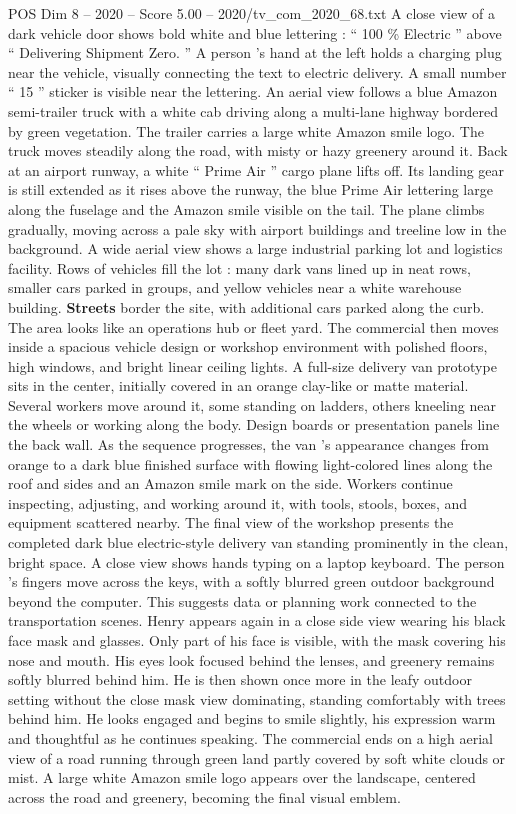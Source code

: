 \begin{textsample}{POS Dim 8 – 2020 – Score 5.00 – 2020/tv\_com\_2020\_68.txt}
A close view of a dark vehicle door shows bold white and blue lettering : “ 100 \% Electric ” above “ Delivering Shipment Zero. ” A person ’s hand at the left holds a charging plug near the vehicle, visually connecting the text to electric delivery.
A small number “ 15 ” sticker is visible near the lettering.
An aerial view follows a blue Amazon semi-trailer truck with a white cab driving along a multi-lane highway bordered by green vegetation.
The trailer carries a large white Amazon smile logo.
The truck moves steadily along the road, with misty or hazy greenery around it.
Back at an airport runway, a white “ Prime Air ” cargo plane lifts off.
Its landing gear is still extended as it rises above the runway, the blue Prime Air lettering large along the fuselage and the Amazon smile visible on the tail.
The plane climbs gradually, moving across a pale sky with airport buildings and treeline low in the background.
A wide aerial view shows a large industrial parking lot and logistics facility.
Rows of vehicles fill the lot : many dark vans lined up in neat rows, smaller cars parked in groups, and yellow vehicles near a white warehouse building. \textbf{Streets} border the site, with additional cars parked along the curb.
The area looks like an operations hub or fleet yard.
The commercial then moves inside a spacious vehicle design or workshop environment with polished floors, high windows, and bright linear ceiling lights.
A full-size delivery van prototype sits in the center, initially covered in an orange clay-like or matte material.
Several workers move around it, some standing on ladders, others kneeling near the wheels or working along the body.
Design boards or presentation panels line the back wall.
As the sequence progresses, the van ’s appearance changes from orange to a dark blue finished surface with flowing light-colored lines along the roof and sides and an Amazon smile mark on the side.
Workers continue inspecting, adjusting, and working around it, with tools, stools, boxes, and equipment scattered nearby.
The final view of the workshop presents the completed dark blue electric-style delivery van standing prominently in the clean, bright space.
A close view shows hands typing on a laptop keyboard.
The person ’s fingers move across the keys, with a softly blurred green outdoor background beyond the computer.
This suggests data or planning work connected to the transportation scenes.
Henry appears again in a close side view wearing his black face mask and glasses.
Only part of his face is visible, with the mask covering his nose and mouth.
His eyes look focused behind the lenses, and greenery remains softly blurred behind him.
He is then shown once more in the leafy outdoor setting without the close mask view dominating, standing comfortably with trees behind him.
He looks engaged and begins to smile slightly, his expression warm and thoughtful as he continues speaking.
The commercial ends on a high aerial view of a road running through green land partly covered by soft white clouds or mist.
A large white Amazon smile logo appears over the landscape, centered across the road and greenery, becoming the final visual emblem.

\end{textsample}
